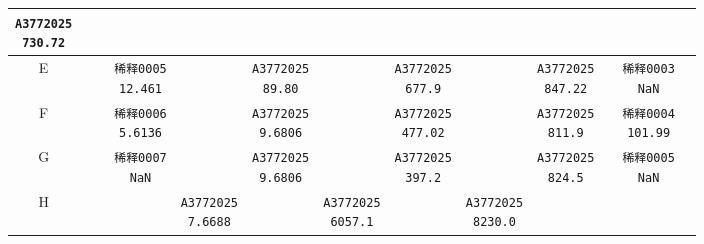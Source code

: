 \documentclass[UTF8,10pt,a4paper,fontset=fandol]{ctexart}
\newcommand{\fieldvalue}[1]{#1}
\begin{document}
\begin{center}
\begin{tabular}{c|*{12}{c|}}
\fieldvalue{\texttt{A3772025\\730.72}}&&&&\\ \hline
E&&&
\fieldvalue{\texttt{稀释0005\\12.461}}&&
\fieldvalue{\texttt{A3772025\\89.80}}&&
\fieldvalue{\texttt{A3772025\\677.9}}&&
\fieldvalue{\texttt{A3772025\\847.22}}&&
\fieldvalue{\texttt{稀释0003\\NaN}}\\ \hline
F&&&
\fieldvalue{\texttt{稀释0006\\5.6136}}&&
\fieldvalue{\texttt{A3772025\\9.6806}}&&
\fieldvalue{\texttt{A3772025\\477.02}}&&
\fieldvalue{\texttt{A3772025\\811.9}}&&
\fieldvalue{\texttt{稀释0004\\101.99}}\\ \hline
G&&&
\fieldvalue{\texttt{稀释0007\\NaN}}&&
\fieldvalue{\texttt{A3772025\\9.6806}}&&
\fieldvalue{\texttt{A3772025\\397.2}}&&
\fieldvalue{\texttt{A3772025\\824.5}}&&
\fieldvalue{\texttt{稀释0005\\NaN}}\\ \hline
H&&&&
\fieldvalue{\texttt{A3772025\\7.6688}}&&
\fieldvalue{\texttt{A3772025\\6057.1}}&&
\fieldvalue{\texttt{A3772025\\8230.0}}&&&&\\ \hline
\end{tabular}
\end{center}
\end{document}
